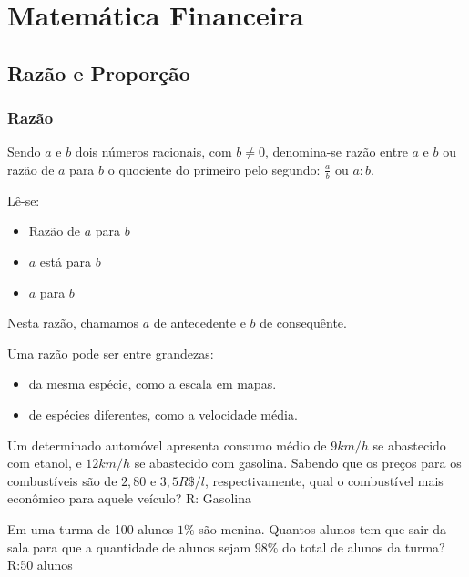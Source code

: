 \chapter{Matemática Financeira}
\section{Razão e Proporção}

\subsection{Razão}

\begin{defi}
Sendo $a$ e $b$ dois números racionais, com $b\not=0$, denomina-se razão entre $a$ e $b$ ou razão de $a$ para $b$ o quociente do primeiro pelo segundo: $\frac{a}{b}$ ou   $a:b$.
\end{defi}

Lê-se:

\begin{itemize}
\item Razão de $a$ para $b$
\item $a$ está para $b$
\item $a$ para $b$
\end{itemize}

Nesta razão, chamamos $a$ de antecedente e $b$ de consequênte.

Uma razão pode ser entre grandezas:
\begin{itemize}
    \item da mesma espécie, como a escala em mapas.
    \item de espécies diferentes, como a velocidade média.
\end{itemize}

\begin{exe}
Um determinado automóvel apresenta consumo médio de $9km/h$ se abastecido com etanol, e $12km/h$ se abastecido com gasolina. Sabendo que os preços para os combustíveis são de $2,80$ e $3,5 R\$/l$, respectivamente, qual o combustível mais econômico para aquele veículo? R: Gasolina
\end{exe}

\begin{exe}
Em uma turma de 100 alunos $1\%$ são menina. Quantos alunos tem que sair da sala para que a quantidade de alunos sejam $98\%$ do total de alunos da turma? R:50 alunos
\end{exe}

